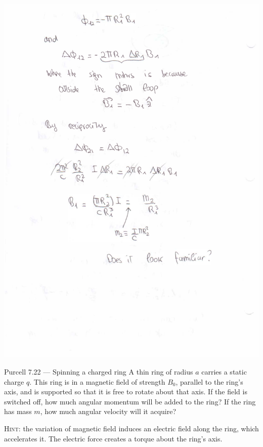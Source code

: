 \documentclass[makesolutionspdf]{esg8022pset}
\begin{document}
\begin{solution}
\begin{center}
    \includegraphics[width = \textwidth, height = 0.9\textheight, keepaspectratio]{ps9_7b}
  \end{center}
\end{solution}

\begin{problem}{Purcell 7.22 --- Spinning a charged ring}
  A thin ring of radius $a$ carries a static charge $q$. This ring is in a
  magnetic field of strength $B_0$, parallel to the ring's axis, and is
  supported so that it is free to rotate about that axis. If the field is
  switched off, how much angular momentum will be added to the ring? If the
  ring has mass $m$, how much angular velocity will it acquire?
  
  \noindent \textsc{Hint}: the variation of magnetic field induces an electric
  field along the ring, which accelerates it. The electric force creates a
  torque about the ring's axis.
\end{problem}
\end{document}
